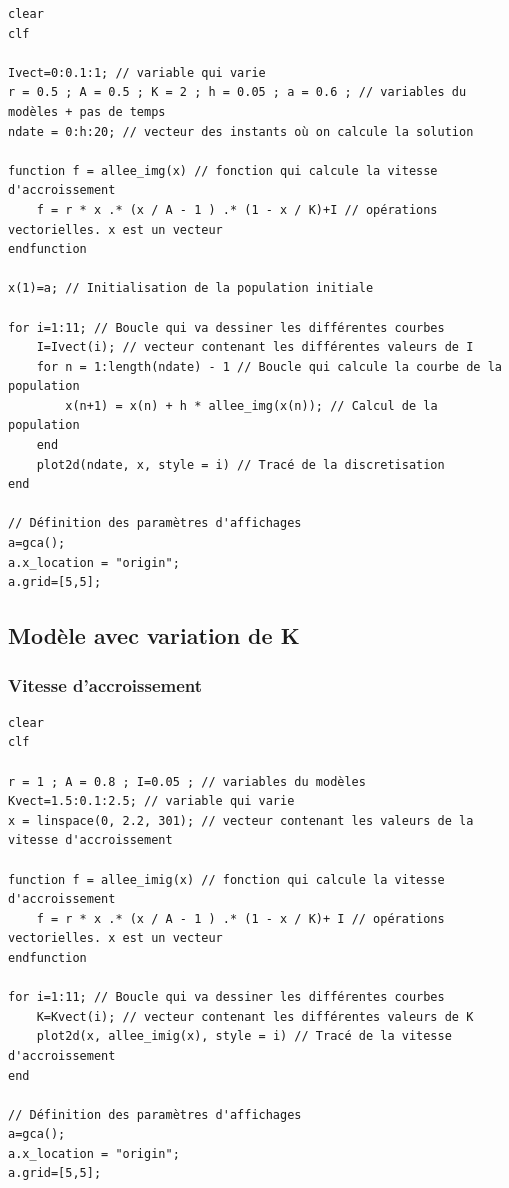 \documentclass{article}
\begin{document}
\begin{verbatim}
clear
clf

Ivect=0:0.1:1; // variable qui varie
r = 0.5 ; A = 0.5 ; K = 2 ; h = 0.05 ; a = 0.6 ; // variables du modèles + pas de temps
ndate = 0:h:20; // vecteur des instants où on calcule la solution

function f = allee_img(x) // fonction qui calcule la vitesse d'accroissement
    f = r * x .* (x / A - 1 ) .* (1 - x / K)+I // opérations vectorielles. x est un vecteur
endfunction

x(1)=a; // Initialisation de la population initiale

for i=1:11; // Boucle qui va dessiner les différentes courbes
    I=Ivect(i); // vecteur contenant les différentes valeurs de I
    for n = 1:length(ndate) - 1 // Boucle qui calcule la courbe de la population
        x(n+1) = x(n) + h * allee_img(x(n)); // Calcul de la population
    end 
    plot2d(ndate, x, style = i) // Tracé de la discretisation
end

// Définition des paramètres d'affichages
a=gca();
a.x_location = "origin";
a.grid=[5,5];
\end{verbatim}

\subsection{Modèle avec variation de K}

\subsubsection{Vitesse d'accroissement}

\begin{verbatim}
clear
clf

r = 1 ; A = 0.8 ; I=0.05 ; // variables du modèles
Kvect=1.5:0.1:2.5; // variable qui varie
x = linspace(0, 2.2, 301); // vecteur contenant les valeurs de la vitesse d'accroissement

function f = allee_imig(x) // fonction qui calcule la vitesse d'accroissement
    f = r * x .* (x / A - 1 ) .* (1 - x / K)+ I // opérations vectorielles. x est un vecteur
endfunction

for i=1:11; // Boucle qui va dessiner les différentes courbes
    K=Kvect(i); // vecteur contenant les différentes valeurs de K
    plot2d(x, allee_imig(x), style = i) // Tracé de la vitesse d'accroissement
end

// Définition des paramètres d'affichages
a=gca();
a.x_location = "origin";
a.grid=[5,5];
\end{verbatim}
\end{document}

